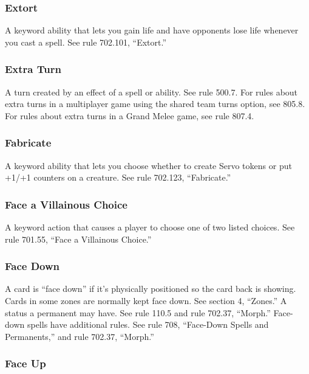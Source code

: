{{{{{{{{{\subsubsection*{Extort}

A keyword ability that lets you gain life and have opponents lose life whenever you cast a spell. See rule 702.101, “Extort.”

\subsubsection*{Extra Turn}

A turn created by an effect of a spell or ability. See rule 500.7. For rules about extra turns in a multiplayer game using the shared team turns option, see 805.8. For rules about extra turns in a Grand Melee game, see rule 807.4.

\subsubsection*{Fabricate}

A keyword ability that lets you choose whether to create Servo tokens or put +1/+1 counters on a creature. See rule 702.123, “Fabricate.”

\subsubsection*{Face a Villainous Choice}

A keyword action that causes a player to choose one of two listed choices. See rule 701.55, “Face a Villainous Choice.”

\subsubsection*{Face Down}

A card is “face down” if it’s physically positioned so the card back is showing. Cards in some zones are normally kept face down. See section 4, “Zones.”
A status a permanent may have. See rule 110.5 and rule 702.37, “Morph.”
Face-down spells have additional rules. See rule 708, “Face-Down Spells and Permanents,” and rule 702.37, “Morph.”

\subsubsection*{Face Up}

}}}}}}}}}
